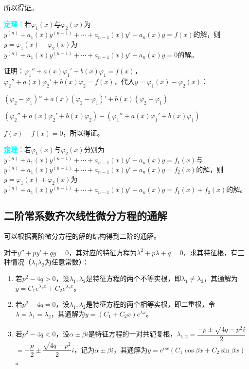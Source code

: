 \documentclass[UTF8, 12pt]{ctexart}
\begin{document}
        所以得证。

        \textcolor{aqua}{\textbf{定理：}}若$\varphi_1(x)$与$\varphi_2(x)$为$y^{(n)}+a_1(x)y^{(n-1)}+\cdots+a_{n-1}(x)y'+a_n(x)y=f(x)$的解，则$y=\varphi_1(x)-\varphi_2(x)$为$y^{(n)}+a_1(x)y^{(n-1)}+\cdots+a_{n-1}(x)y'+a_n(x)y=0$的解。

        证明：$\varphi_1''+a(x)\varphi_1'+b(x)\varphi_1=f(x)$，$\varphi_2''+a(x)\varphi_2'+b(x)\varphi_2=f(x)$，代入$y=\varphi_1(x)-\varphi_2(x)$：

        $(\varphi_2-\varphi_1)''+a(x)(\varphi_2-\varphi_1)'+b(x)(\varphi_2-\varphi_1)$

        $(\varphi_2''+a(x)\varphi_2'+b(x)\varphi_2)-(\varphi_1''+a(x)\varphi_1'+b(x)\varphi_1)$

        $f(x)-f(x)=0$，所以得证。

        \textcolor{aqua}{\textbf{定理：}}若$\varphi_1(x)$与$\varphi_2(x)$分别为$y^{(n)}+a_1(x)y^{(n-1)}+\cdots+a_{n-1}(x)y'+a_n(x)y=f_1(x)$与$y^{(n)}+a_1(x)y^{(n-1)}+\cdots+a_{n-1}(x)y'+a_n(x)y=f_2(x)$的解，则$y=\varphi_1(x)+\varphi_2(x)$为$y^{(n)}+a_1(x)y^{(n-1)}+\cdots+a_{n-1}(x)y'+a_n(x)y=f_1(x)+f_2(x)$的解。

        \subsection{二阶常系数齐次线性微分方程的通解}

        可以根据高阶微分方程的解的结构得到二阶的通解。

        对于$y''+py'+qy=0$，其对应的特征方程为$\lambda^2+p\lambda+q=0$，求其特征根，有三种情况（$\lambda_1\lambda_2$为任意常数）：

        \begin{enumerate}
            \item 若$p^2-4q>0$，设$\lambda_1,\lambda_2$是特征方程的两个不等实根，即$\lambda_1\neq\lambda_2$，其通解为$y=C_1e^{\lambda_1x}+C_2e^{\lambda_2x}$。
            \item 若$p^2-4q=0$，设$\lambda_1,\lambda_2$是特征方程的两个相等实根，即二重根，令$\lambda=\lambda_1=\lambda_2$，其通解为$y=(C_1+C_2x)e^{\lambda x}$。
            \item 若$p^2-4q<0$，设$\alpha\pm\beta i$是特征方程的一对共轭复根，$\lambda_{1,2}=\dfrac{-p\pm\sqrt{4q-p^2}i}{2}$\\$=-\dfrac{p}{2}\pm\dfrac{\sqrt{4q-p^2}}{2}i$，记为$\alpha\pm\beta i$，其通解为$y=e^{\alpha x}(C_1\cos\beta x+C_2\sin\beta x)$。
        \end{enumerate}
\end{document}
